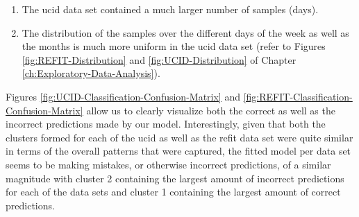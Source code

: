 \begin{enumerate}
    \item The \gls{ucid} data set contained a much larger number of samples (days).
    \item The distribution of the samples over the different days of the week as well as the months is much more uniform in the \gls{ucid} data set (refer to Figures \ref{fig:REFIT-Distribution} and \ref{fig:UCID-Distribution} of Chapter \ref{ch:Exploratory-Data-Analysis}).
\end{enumerate}

\noindent \newline Figures \ref{fig:UCID-Classification-Confusion-Matrix} and \ref{fig:REFIT-Classification-Confusion-Matrix} allow us to clearly visualize both the correct as well as the incorrect predictions made by our model. Interestingly, given that both the clusters formed for each of the \gls{ucid} as well as the \gls{refit} data set were quite similar in terms of the overall patterns that were captured, the fitted model per data set seems to be making mistakes, or otherwise incorrect predictions, of a similar magnitude with cluster 2 containing the largest amount of incorrect predictions for each of the data sets and cluster 1 containing the largest amount of correct predictions.


